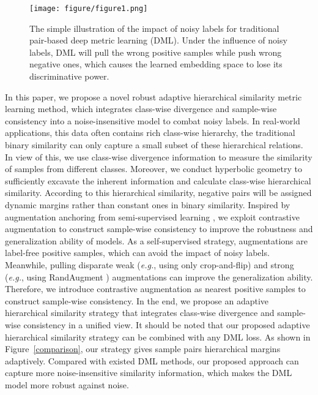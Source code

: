 \documentclass[lettersize,journal]{IEEEtran}
\begin{document}
\begin{figure*}[!t]
	\centering
	\texttt{[image: figure/figure1.png]}
	\caption{The simple illustration of the impact of noisy labels for traditional pair-based deep metric learning (DML). Under the influence of noisy labels, DML will pull the wrong positive samples while push wrong negative ones, which causes the learned embedding space to lose its discriminative power.}
	\label{noisy-label}
\end{figure*}


In this paper, we propose a novel robust adaptive hierarchical similarity metric learning method, which integrates  class-wise divergence and sample-wise consistency into a  noise-insensitive  model to  combat noisy labels.  In real-world applications, this data often contains rich class-wise hierarchy, the traditional binary similarity can only  capture a small subset of these hierarchical relations. In view of this, we use class-wise divergence information to measure the similarity of samples from different classes. Moreover, we conduct hyperbolic geometry to sufficiently excavate the inherent information and calculate class-wise hierarchical similarity. According to this hierarchical similarity, negative pairs will be assigned dynamic margins rather than constant ones in binary similarity. Inspired by augmentation anchoring from semi-supervised learning \cite{sohn2020fixmatch}, we exploit contrastive augmentation to construct sample-wise consistency to improve the robustness and generalization ability of models. As a self-supervised strategy, augmentations are label-free positive samples, which can avoid the impact of noisy labels. Meanwhile, pulling disparate weak (\textit{e.g.}, using only crop-and-flip) and strong (\textit{e.g.}, using RandAugment \cite{cubuk2020randaugment}) augmentations can improve the generalization ability. Therefore, we introduce contrastive augmentation as nearest positive samples to construct sample-wise consistency. In the end, we propose an adaptive hierarchical similarity strategy that integrates class-wise divergence and sample-wise consistency in a unified view. It should be noted that our proposed adaptive hierarchical similarity strategy can be combined with any DML loss. As shown in Figure~\ref{comparison}, our strategy gives sample pairs hierarchical margins adaptively. Compared with existed DML methods, our proposed approach can capture more noise-insensitive similarity information, which makes the DML model more robust against noise. 
\end{document}
